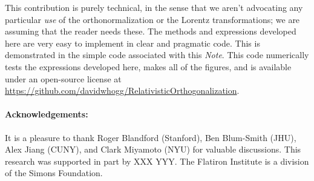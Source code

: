 \documentclass{article}
\newcommand{\documentname}{\textsl{Note}}
\begin{document}
This contribution is purely technical, in the sense that we aren't advocating any particular \emph{use} of the orthonormalization or the Lorentz transformations; we are assuming that the reader needs these.
The methods and expressions developed here are very easy to implement in clear and pragmatic code.
This is demonstrated in the simple code associated with this \documentname.
This code numerically tests the expressions developed here, makes all of the figures, and is available under an open-source license at \url{https://github.com/davidwhogg/RelativisticOrthogonalization}.

\paragraph{Acknowledgements:}
It is a pleasure to thank
  Roger Blandford (Stanford),
  Ben Blum-Smith (JHU),
  Alex Jiang (CUNY), and
  Clark Miyamoto (NYU)
for valuable discussions.
This research was supported in part by XXX YYY.
The Flatiron Institute is a division of the Simons Foundation.

\raggedright


\end{document}

